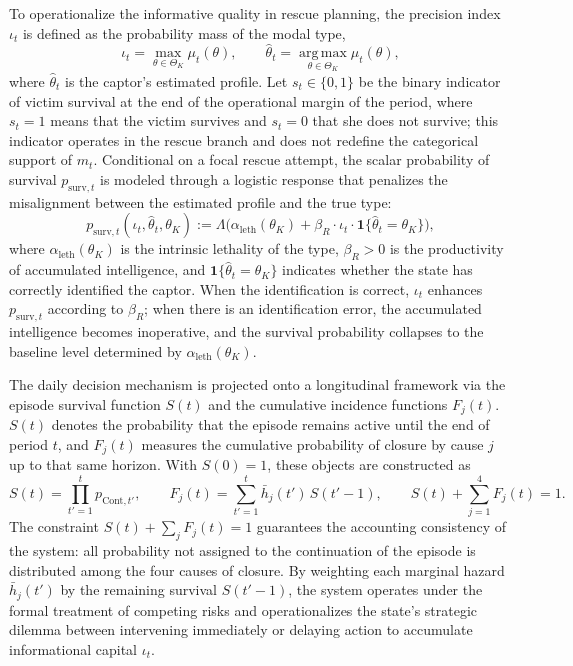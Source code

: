 \documentclass[ecta,nameyear,draft]{econsocart}
\theoremstyle{plain}
\theoremstyle{definition}
\newcommand{\ThetaK}{\Theta_K}
\newcommand{\1}{\mathbf{1}}
\begin{document}
To operationalize the informative quality in rescue planning, the precision index $\iota_t$ is defined as the probability mass of the modal type,
\begin{equation}
\iota_t=\max_{\theta\in\ThetaK}\mu_t(\theta),\qquad\hat{\theta}_t=\operatorname*{arg\,max}_{\theta\in\ThetaK}\mu_t(\theta),
\label{eq:iota}
\end{equation}
where $\hat{\theta}_t$ is the captor's estimated profile. Let $s_t\in\{0,1\}$ be the binary indicator of victim survival at the end of the operational margin of the period, where $s_t=1$ means that the victim survives and $s_t=0$ that she does not survive; this indicator operates in the rescue branch and does not redefine the categorical support of $m_t$. Conditional on a focal rescue attempt, the scalar probability of survival $p_{\mathrm{surv},t}$ is modeled through a logistic response that penalizes the misalignment between the estimated profile and the true type:
\begin{equation}
p_{\mathrm{surv},t}(\iota_t,\hat{\theta}_t,\theta_K):=\Lambda\bigl(\alpha_{\mathrm{leth}}(\theta_K)+\beta_R\cdot\iota_t\cdot\mathbf{1}\{\hat{\theta}_t=\theta_K\}\bigr),
\label{eq:p-surv}
\end{equation}
where $\alpha_{\mathrm{leth}}(\theta_K)$ is the intrinsic lethality of the type, $\beta_R>0$ is the productivity of accumulated intelligence, and $\mathbf{1}\{\hat{\theta}_t=\theta_K\}$ indicates whether the state has correctly identified the captor. When the identification is correct, $\iota_t$ enhances $p_{\mathrm{surv},t}$ according to $\beta_R$; when there is an identification error, the accumulated intelligence becomes inoperative, and the survival probability collapses to the baseline level determined by $\alpha_{\mathrm{leth}}(\theta_K)$.

The daily decision mechanism is projected onto a longitudinal framework via the episode survival function $S(t)$ and the cumulative incidence functions $F_j(t)$. $S(t)$ denotes the probability that the episode remains active until the end of period $t$, and $F_j(t)$ measures the cumulative probability of closure by cause $j$ up to that same horizon. With $S(0)=1$, these objects are constructed as
\begin{equation}
S(t)=\prod_{t'=1}^{t}p_{\mathrm{Cont},t'},\qquad F_j(t)=\sum_{t'=1}^{t}\bar h_j(t')\,S(t'-1),\qquad S(t)+\sum_{j=1}^{4}F_j(t)=1.
\label{eq:longitudinal}
\end{equation}
The constraint $S(t)+\sum_j F_j(t)=1$ guarantees the accounting consistency of the system: all probability not assigned to the continuation of the episode is distributed among the four causes of closure. By weighting each marginal hazard $\bar h_j(t')$ by the remaining survival $S(t'-1)$, the system operates under the formal treatment of competing risks and operationalizes the state's strategic dilemma between intervening immediately or delaying action to accumulate informational capital $\iota_t$.
\end{document}
